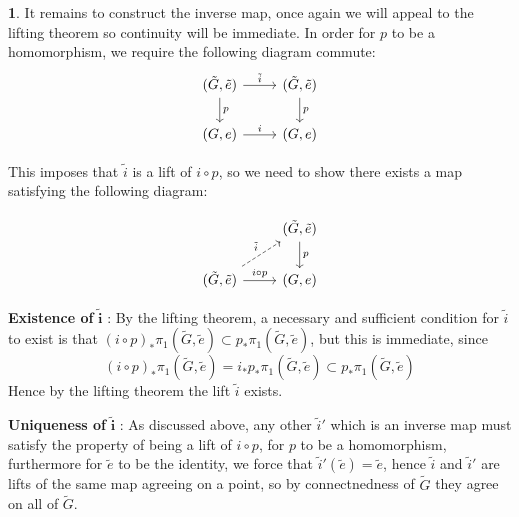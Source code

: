 \documentclass[10.5pt]{article}
\theoremstyle{definition}
\newtheorem{pb}{}
\begin{document}
\begin{pb}
        It remains to construct the inverse map, once again we will appeal to the lifting theorem so continuity will be immediate. In order for \(p\) to be a homomorphism, we require the following diagram commute:
        \begin{equation*} 
            \begin{tikzcd}
                (\tilde{G},\tilde{e})\arrow[r, "\tilde{i}"] \arrow[d, "p"]& (\tilde{G},\tilde{e})\arrow[d, "p"]\\
                (G,e)\arrow[r, "i"]& (G,e)
            \end{tikzcd}
        \end{equation*}

        This imposes that \(\tilde{i}\) is a lift of \(i \circ p\), so we need to show there exists a map satisfying the following diagram:

        \begin{equation*}
            \begin{tikzcd}
                &(\tilde{G},\tilde{e})\ar[d, "p"]\\
                (\tilde{G},\tilde{e})\ar[r, "i \circ p"]\ar[ru, "\tilde{i}", dashed]&(G,e)
                \end{tikzcd}
        \end{equation*}

        \textbf{Existence of }\(\mathbf{\tilde{i}}\) :
        By the lifting theorem, a necessary and sufficient condition for \(\tilde{i}\) to exist is that \((i \circ p)_* \pi_1(\tilde{G},\tilde{e}) \subset p_*\pi_1(\tilde{G},\tilde{e})\), but this is immediate, since
        \[(i \circ p)_* \pi_1(\tilde{G},\tilde{e}) = i_*p_*\pi_1(\tilde{G},\tilde{e}) \subset p_*\pi_1(\tilde{G},\tilde{e})\]
        Hence by the lifting theorem the lift \(\tilde{i}\) exists.

        \textbf{Uniqueness of }\(\mathbf{\tilde{i}}\) : As discussed above, any other \(\tilde{i}'\) which is an inverse map must satisfy the property of being a lift of \(i \circ p\), for \(p\) to be a homomorphism, furthermore for \(\tilde{e}\) to be the identity, we force that \(\tilde{i}'(\tilde{e}) = \tilde{e}\), hence \(\tilde{i}\) and \(\tilde{i}'\) are lifts of the same map agreeing on a point, so by connectnedness of \(\tilde{G}\) they agree on all of \(\tilde{G}\).


\end{pb}
\end{document}
